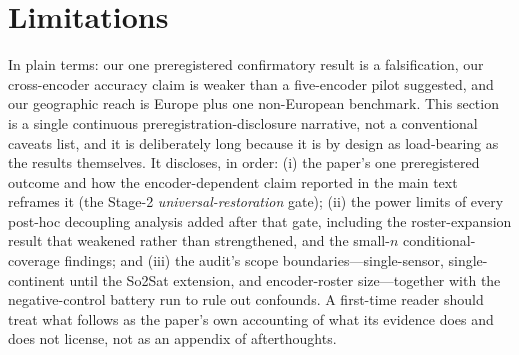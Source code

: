 \documentclass[11pt]{article}
\begin{document}
\begin{table}[!t]\centering\small
\caption{Deployment reliability report card (illustration; post-hoc) for a median-accuracy frozen encoder
(Clay~v1.5) monitoring land cover in an unseen region at $\alpha{=}0.05$. Multi-label FNR rows: GEO-Bench
\texttt{m-bigearthnet}, $E\!\to\!W$ shift; worst-class row: GEO-Bench \texttt{m-so2sat} LCZ-17 (split arm).
Brackets are seed-level $t$-CIs ($n{=}5$). All values trace to the frozen result
records described in the code archive.}\label{tab:reportcard}
\end{table}

\section{Limitations}\label{sec:limitations}
In plain terms: our one preregistered confirmatory result is a falsification, our cross-encoder
accuracy claim is weaker than a five-encoder pilot suggested, and our geographic reach is Europe plus one
non-European benchmark.
This section is a single continuous preregistration-disclosure narrative, not a conventional caveats
list, and it is deliberately long because it is by design as load-bearing as the results themselves. It
discloses, in order: (i) the paper's one preregistered outcome and how the encoder-dependent claim
reported in the main text reframes it (the Stage-2 \emph{universal-restoration} gate); (ii) the power
limits of every post-hoc decoupling analysis added after that gate, including the roster-expansion result
that weakened rather than strengthened, and the small-$n$ conditional-coverage findings; and (iii) the
audit's scope boundaries---single-sensor, single-continent until the So2Sat extension, and encoder-roster
size---together with the negative-control battery run to rule out confounds. A first-time reader should
treat what follows as the paper's own accounting of what its evidence does and does not license, not as
an appendix of afterthoughts.
\end{document}
